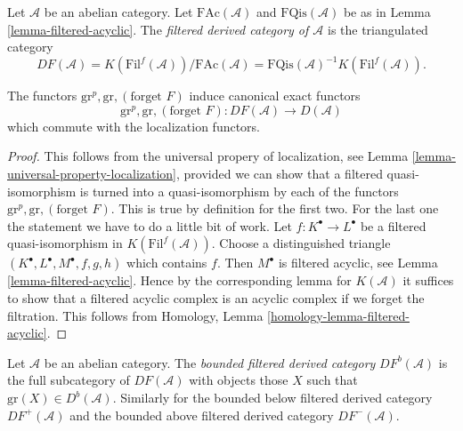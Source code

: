 \begin{definition}
\label{definition-filtered-derived}
Let $\mathcal{A}$ be an abelian category.
Let $\text{FAc}(\mathcal{A})$ and $\text{FQis}(\mathcal{A})$
be as in
Lemma \ref{lemma-filtered-acyclic}.
The {\it filtered derived category of $\mathcal{A}$}
is the triangulated category
$$
DF(\mathcal{A}) =
K(\text{Fil}^f(\mathcal{A}))/\text{FAc}(\mathcal{A}) =
\text{FQis}(\mathcal{A})^{-1} K(\text{Fil}^f(\mathcal{A})).
$$
\end{definition}

\begin{lemma}
\label{lemma-filtered-derived-functors}
The functors $\text{gr}^p, \text{gr}, (\text{forget }F)$ induce
canonical exact functors
$$
\text{gr}^p, \text{gr}, (\text{forget }F):
DF(\mathcal{A})
\longrightarrow
D(\mathcal{A})
$$
which commute with the localization functors.
\end{lemma}

\begin{proof}
This follows from the universal propery of localization, see
Lemma \ref{lemma-universal-property-localization},
provided we can show that a filtered quasi-isomorphism is turned
into a quasi-isomorphism by each of the functors
$\text{gr}^p, \text{gr}, (\text{forget }F)$. This is true by definition
for the first two. For the last one the statement we have to do a little
bit of work. Let $f : K^\bullet \to L^\bullet$ be a filtered
quasi-isomorphism in $K(\text{Fil}^f(\mathcal{A}))$.
Choose a distinguished triangle $(K^\bullet, L^\bullet, M^\bullet, f, g, h)$
which contains $f$. Then $M^\bullet$ is filtered acyclic, see
Lemma \ref{lemma-filtered-acyclic}.
Hence by the corresponding lemma for $K(\mathcal{A})$ it suffices
to show that a filtered acyclic complex is an acyclic complex if
we forget the filtration.
This follows from
Homology, Lemma \ref{homology-lemma-filtered-acyclic}.
\end{proof}

\begin{definition}
\label{definition-filtered-derived-bounded}
Let $\mathcal{A}$ be an abelian category.
The {\it bounded filtered derived category} $DF^b(\mathcal{A})$ is
the full subcategory of $DF(\mathcal{A})$ with objects those $X$
such that $\text{gr}(X) \in D^b(\mathcal{A})$.
Similarly for the bounded below filtered derived category
$DF^{+}(\mathcal{A})$ and the bounded above filtered derived category
$DF^{-}(\mathcal{A})$.
\end{definition}

